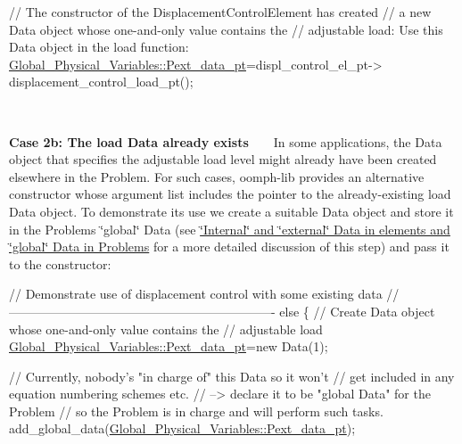 \begin{DoxyItemize}
\begin{DoxyItemize}
\begin{DoxyCodeInclude}
     \textcolor{comment}{// The constructor of the  DisplacementControlElement has created}
     \textcolor{comment}{// a new Data object whose one-and-only value contains the}
     \textcolor{comment}{// adjustable load: Use this Data object in the load function:}
     \hyperlink{namespaceGlobal__Physical__Variables_a9d598320fb3d7ecf94101088e8f376d2}{Global\_Physical\_Variables::Pext\_data\_pt}=displ\_control\_el\_pt->
      displacement\_control\_load\_pt();

\end{DoxyCodeInclude}
 ~\newline
~\newline

\item {\bfseries Case 2b\+: The load {\ttfamily Data} already exists} ~\newline
~\newline
 In some applications, the {\ttfamily Data} object that specifies the adjustable load level might already have been created elsewhere in the {\ttfamily Problem}. For such cases, {\ttfamily oomph-\/lib} provides an alternative constructor whose argument list includes the pointer to the already-\/existing load {\ttfamily Data} object. To demonstrate its use we create a suitable {\ttfamily Data} object and store it in the {\ttfamily Problem\textquotesingle{}s} \char`\"{}global\char`\"{} {\ttfamily Data} (see \hyperlink{index_global_data}{\char`\"{}\+Internal\char`\"{} and \char`\"{}external\char`\"{} Data in elements and \char`\"{}global\char`\"{} Data in Problems} for a more detailed discussion of this step) and pass it to the constructor\+: ~\newline
~\newline
 
\begin{DoxyCodeInclude}
   \textcolor{comment}{// Demonstrate use of displacement control with some existing data }
   \textcolor{comment}{//----------------------------------------------------------------}
   \textcolor{keywordflow}{else}
    \{
     \textcolor{comment}{// Create Data object whose one-and-only value contains the}
     \textcolor{comment}{// adjustable load}
     \hyperlink{namespaceGlobal__Physical__Variables_a9d598320fb3d7ecf94101088e8f376d2}{Global\_Physical\_Variables::Pext\_data\_pt}=\textcolor{keyword}{new} Data(1);
     
     \textcolor{comment}{// Currently, nobody's "in charge of" this Data so it won't}
     \textcolor{comment}{// get included in any equation numbering schemes etc.}
     \textcolor{comment}{// --> declare it to be "global Data" for the Problem}
     \textcolor{comment}{// so the Problem is in charge and will perform such tasks.}
     add\_global\_data(\hyperlink{namespaceGlobal__Physical__Variables_a9d598320fb3d7ecf94101088e8f376d2}{Global\_Physical\_Variables::Pext\_data\_pt});
     

\end{DoxyCodeInclude}
\end{DoxyItemize}
\end{DoxyItemize}
